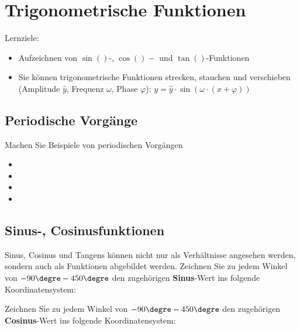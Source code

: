 
\section{Trigonometrische
  Funktionen}

Lernziele:
\begin{itemize}
\item Aufzeichnen von $\sin()$-, $\cos()-$ und $\tan()$-Funktionen
\item Sie können trigonometrische Funktionen strecken, stauchen und
  verschieben (Amplitude $\hat{y}$, Frequenz $\omega$, Phase
  $\varphi$): $y=\hat{y}\cdot{}\sin(\omega\cdot{}(x+\varphi))$
\end{itemize}


\subsection{Periodische Vorgänge}
Machen Sie Beispiele von periodischen Vorgängen
\begin{itemize}
  \item {}
  \item {}
  \item {}
  \item {}
\end{itemize}
\newpage

\subsection{Sinus-, Cosinusfunktionen}
Sinus, Cosinus und Tangens können nicht nur als Verhältnisse angesehen
werden, sondern auch als Funktionen abgebildet werden.
Zeichnen Sie zu jedem Winkel von $-90\degre - 450\degre$ den zugehörigen
\textbf{Sinus}-Wert ins folgende Koordinatensystem:

\noTRAINER{\trigsysD}\TRAINER{\trigsysDsin}



Zeichnen Sie zu jedem Winkel von $-90\degre - 450\degre$ den zugehörigen
\textbf{Cosinus}-Wert ins folgende Koordinatensystem:

